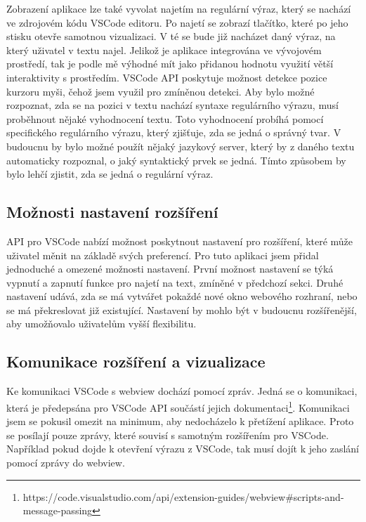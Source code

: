 Zobrazení aplikace lze také vyvolat najetím na regulární výraz, který se nachází ve zdrojovém kódu VSCode editoru.
Po najetí se zobrazí tlačítko, které po jeho stisku otevře samotnou vizualizaci.
V té se bude již nacházet daný výraz, na který uživatel v textu najel.
Jelikož je aplikace integrována ve vývojovém prostředí, tak je podle mě výhodné mít jako přidanou hodnotu využití větší interaktivity s prostředím.
VSCode API poskytuje možnost detekce pozice kurzoru myši, čehož jsem využil pro zmíněnou detekci.
Aby bylo možné rozpoznat, zda se na pozici v textu nachází syntaxe regulárního výrazu, musí proběhnout nějaké vyhodnocení textu.
Toto vyhodnocení probíhá pomocí specifického regulárního výrazu, který zjišťuje, zda se jedná o správný tvar.
V budoucnu by bylo možné použít nějaký jazykový server, který by z daného textu automaticky rozpoznal, o jaký syntaktický prvek se jedná.
Tímto způsobem by bylo lehčí zjistit, zda se jedná o regulární výraz.

\subsection*{Možnosti nastavení rozšíření}

API pro VSCode nabízí možnost poskytnout nastavení pro rozšíření, které může uživatel měnit na základě svých preferencí.
Pro tuto aplikaci jsem přidal jednoduché a omezené možnosti nastavení.
První možnost nastavení se týká vypnutí a zapnutí funkce pro najetí na text, zmíněné v předchozí sekci.
Druhé nastavení udává, zda se má vytvářet pokaždé nové okno webového rozhraní, nebo se má překreslovat již existující.
Nastavení by mohlo být v budoucnu rozšířenější, aby umožňovalo uživatelům vyšší flexibilitu. 

\subsection*{Komunikace rozšíření a vizualizace}

Ke komunikaci VSCode s webview dochází pomocí zpráv.
Jedná se o komunikaci, která je předepsána pro VSCode API součástí jejich dokumentaci\footnote{https://code.visualstudio.com/api/extension-guides/webview\#scripts-and-message-passing}.
Komunikaci jsem se pokusil omezit na minimum, aby nedocházelo k přetížení aplikace.
Proto se posílají pouze zprávy, které souvisí s samotným rozšířením pro VSCode.
Například pokud dojde k otevření výrazu z VSCode, tak musí dojít k jeho zaslání pomocí zprávy do webview.

\endinput